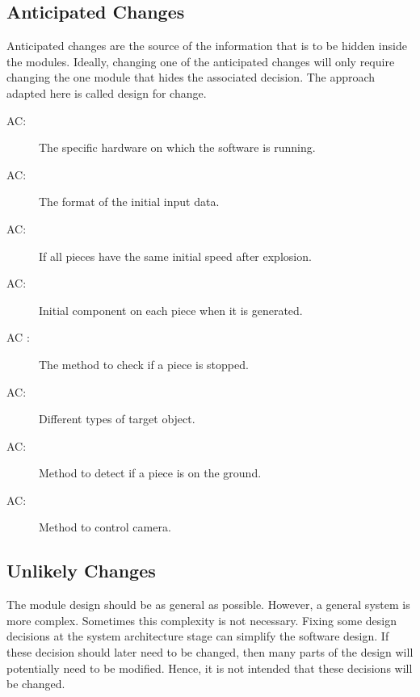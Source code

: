 \documentclass[12pt, titlepage]{article}
\newcounter{acnum}
\newcommand{\actheacnum}{AC\theacnum}
\begin{document}
	\subsection{Anticipated Changes} \label{SecAchange}
	
	Anticipated changes are the source of the information that is to be hidden
	inside the modules. Ideally, changing one of the anticipated changes will only
	require changing the one module that hides the associated decision. The approach
	adapted here is called design for
	change.
	
	\begin{description}
		\item[ \actheacnum \label{acHardware}:] The specific
		hardware on which the software is running.
		\item[ \actheacnum \label{acInput}:] The format of the
		initial input data.
		\item[ \actheacnum \label{acPO}:] If all pieces have the same initial speed after explosion.
		\item[ \actheacnum \label{acPI}:] Initial component on each piece when it is generated. 
		\item[ \actheacnum
		\label{acMove}:] The method to check if a piece is stopped. 
		\item[ \actheacnum \label{acTO}:] Different types of target object. 
		\item[ \actheacnum \label{acCD}:] Method to detect if a piece is on the ground.
		\item[ \actheacnum \label{acCC}:] Method to control camera.
	\end{description}
	
	\subsection{Unlikely Changes} \label{SecUchange}
	
	The module design should be as general as possible. However, a general system is
	more complex. Sometimes this complexity is not necessary. Fixing some design
	decisions at the system architecture stage can simplify the software design. If
	these decision should later need to be changed, then many parts of the design
	will potentially need to be modified. Hence, it is not intended that these
	decisions will be changed.
	
\end{document}
